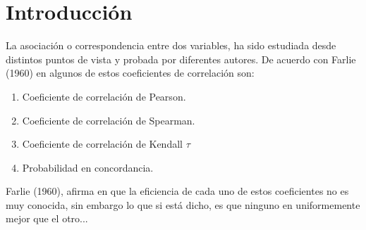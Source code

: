 \chapter*{Introducción}


La asociación o correspondencia entre dos variables, ha sido estudiada desde distintos puntos de vista y probada por diferentes autores. De acuerdo con Farlie (1960) en \cite{farlie} algunos de estos coeficientes de correlación son: 

\begin{enumerate}
\item Coeficiente de correlación de Pearson.
\item Coeficiente de correlación de Spearman.
\item Coeficiente de correlación de Kendall $\tau$
\item Probabilidad en concordancia. 
\end{enumerate}

Farlie (1960), afirma en \cite{farlie} que la eficiencia de cada uno de estos coeficientes no es muy conocida, sin embargo lo que si está dicho, es que ninguno en uniformemente mejor que el otro...